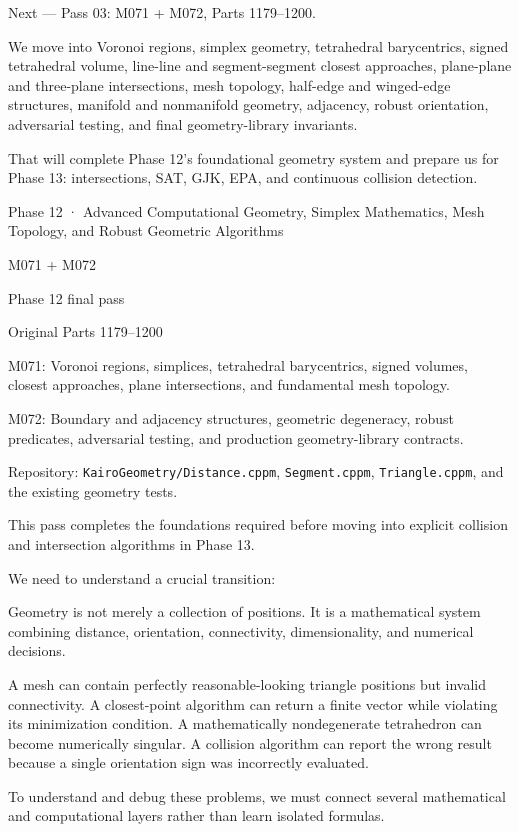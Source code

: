 Next --- Pass 03: M071 + M072, Parts 1179--1200.

We move into Voronoi regions, simplex geometry, tetrahedral barycentrics, signed tetrahedral volume, line-line and segment-segment closest approaches, plane-plane and three-plane intersections, mesh topology, half-edge and winged-edge structures, manifold and nonmanifold geometry, adjacency, robust orientation, adversarial testing, and final geometry-library invariants.

That will complete Phase 12's foundational geometry system and prepare us for Phase 13: intersections, SAT, GJK, EPA, and continuous collision detection.

Phase 12 · Advanced Computational Geometry, Simplex Mathematics, Mesh Topology, and Robust Geometric Algorithms

M071 + M072

Phase 12 final pass

Original Parts 1179--1200

M071: Voronoi regions, simplices, tetrahedral barycentrics, signed volumes, closest approaches, plane intersections, and fundamental mesh topology.

M072: Boundary and adjacency structures, geometric degeneracy, robust predicates, adversarial testing, and production geometry-library contracts.

Repository: \texttt{KairoGeometry/Distance.cppm}, \texttt{Segment.cppm}, \texttt{Triangle.cppm}, and the existing geometry tests.

This pass completes the foundations required before moving into explicit collision and intersection algorithms in Phase 13.

We need to understand a crucial transition:

Geometry is not merely a collection of positions. It is a mathematical system combining distance, orientation, connectivity, dimensionality, and numerical decisions.

A mesh can contain perfectly reasonable-looking triangle positions but invalid connectivity. A closest-point algorithm can return a finite vector while violating its minimization condition. A mathematically nondegenerate tetrahedron can become numerically singular. A collision algorithm can report the wrong result because a single orientation sign was incorrectly evaluated.

To understand and debug these problems, we must connect several mathematical and computational layers rather than learn isolated formulas.

